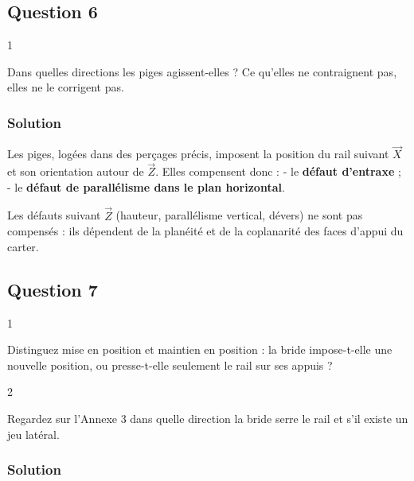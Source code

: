 \documentclass[11pt,a4paper]{article}
\begin{document}
\hypertarget{question-6}{%
\subsection{Question 6}\label{question-6}}

\begin{indication}{1}

Dans quelles directions les piges agissent-elles ? Ce qu'elles ne contraignent pas, elles ne le corrigent pas.

\end{indication}

\hypertarget{solution-5}{%
\subsubsection{Solution}\label{solution-5}}

Les piges, logées dans des perçages précis, imposent la position du rail suivant \(\vec X\) et son orientation autour de \(\vec Z\). Elles compensent donc :
- le \textbf{défaut d'entraxe} ;
- le \textbf{défaut de parallélisme dans le plan horizontal}.

Les défauts suivant \(\vec Z\) (hauteur, parallélisme vertical, dévers) ne sont pas compensés : ils dépendent de la planéité et de la coplanarité des faces d'appui du carter.

\hypertarget{question-7}{%
\subsection{Question 7}\label{question-7}}

\begin{indication}{1}

Distinguez mise en position et maintien en position : la bride impose-t-elle une nouvelle position, ou presse-t-elle seulement le rail sur ses appuis ?

\end{indication}

\begin{indication}{2}

Regardez sur l'Annexe 3 dans quelle direction la bride serre le rail et s'il existe un jeu latéral.

\end{indication}

\hypertarget{solution-6}{%
\subsubsection{Solution}\label{solution-6}}
\end{document}
